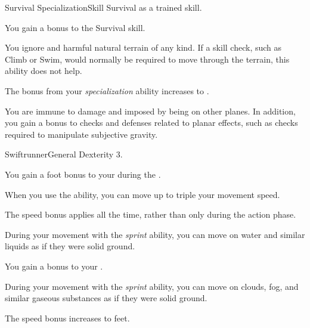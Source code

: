   \begin{feat}{Survival Specialization}{Skill}
    \featpre Survival as a trained skill.

     You gain a  bonus to the Survival skill.

     You ignore  and harmful natural terrain of any kind.
    If a skill check, such as Climb or Swim, would normally be required to move through the terrain, this ability does not help.

     The bonus from your \textit{specialization} ability increases to .

     You are immune to damage and  imposed by being on other planes.
    In addition, you gain a  bonus to checks and defenses related to planar effects, such as checks required to manipulate subjective gravity.
  \end{feat}

  \begin{feat}{Swiftrunner}{General}
    \featpre Dexterity 3.

     You gain a  foot bonus to your  during the .

     When you use the  ability, you can move up to triple your movement speed.

     The speed bonus applies all the time, rather than only during the action phase.

     During your movement with the \textit{sprint} ability, you can move on water and similar liquids as if they were solid ground.

     You gain a  bonus to your .

     During your movement with the \textit{sprint} ability, you can move on clouds, fog, and similar gaseous substances as if they were solid ground.

     The speed bonus increases to  feet.
  \end{feat}

